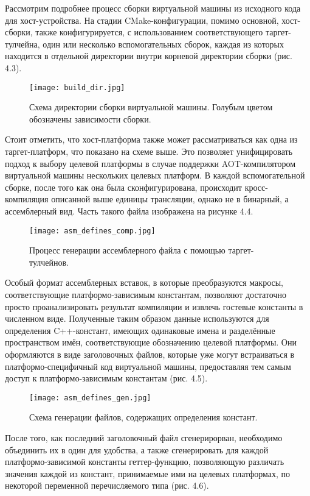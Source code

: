Рассмотрим подробнее процесс сборки виртуальной машины из исходного кода для хост-устройства.
На стадии CMake-конфигурации, помимо основной, хост-сборки, также конфигурируется, с использованием соответствующего таргет-тулчейна, один или несколько вспомогательных сборок, каждая из которых находится в отдельной директории внутри корневой директории сборки (рис. 4.3).

\begin{figure}[H]
    \centering
    \texttt{[image: build\_dir.jpg]}
    \caption{Схема директории сборки виртуальной машины. Голубым цветом обозначены зависимости сборки.}
\end{figure}

Стоит отметить, что хост-платформа также может рассматриваться как одна из таргет-платформ, что показано на схеме выше.
Это позволяет унифицировать подход к выбору целевой платформы в случае поддержки AOT-компилятором виртуальной машины нескольких целевых платформ.
В каждой вспомогательной сборке, после того как она была сконфигурирована, происходит кросс-компиляция описанной выше единицы трансляции, однако не в бинарный, а ассемблерный вид. Часть такого файла изображена на рисунке 4.4.

\begin{figure}[H]
    \centering
    \texttt{[image: asm\_defines\_comp.jpg]}
    \caption{Процесс генерации ассемблерного файла с помощью таргет-тулчейнов.}
\end{figure}

Особый формат ассемблерных вставок, в которые преобразуются макросы, соответствующие платформо-зависимым константам, позволяют достаточно просто проанализировать результат компиляции и извлечь гостевые константы в численном виде.
Полученные таким образом данные используются для определения C++-констант, имеющих одинаковые имена и разделённые пространством имён, соответствующие обозначению целевой платформы. Они оформляются в виде заголовочных файлов, которые уже могут встраиваться в платформо-специфичный код виртуальной машины, предоставляя тем самым доступ к платформо-зависимым константам (рис. 4.5).

\begin{figure}[H]
    \centering
    \texttt{[image: asm\_defines\_gen.jpg]}
    \caption{Схема генерации файлов, содержащих определения констант.}
\end{figure}

После того, как последний заголовочный файл сгенерирорван, необходимо объединить их в один для удобства, а также сгенерировать для каждой платформо-зависимой константы геттер-функцию, позволяющую различать значения каждой из констант, принимаемые ими на целевых платформах, по некоторой переменной перечисляемого типа (рис. 4.6).

